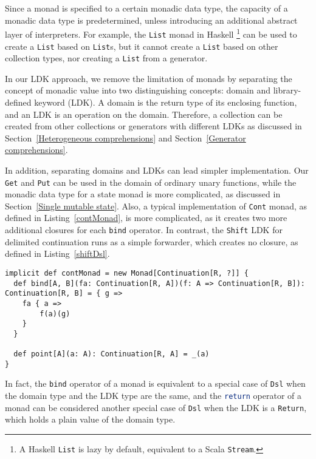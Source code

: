 Since a monad is specified to a certain monadic data type, the capacity of a monadic data type is predetermined, unless introducing an additional abstract layer of interpreters. For example, the \lstinline{List} monad in Haskell \footnote{A Haskell \lstinline{List} is lazy by default, equivalent to a Scala \lstinline{Stream}.} can be used to create a \lstinline{List} based on \lstinline{List}s, but it cannot create a \lstinline{List} based on other collection types, nor creating a \lstinline{List} from a generator.

In our LDK approach, we remove the limitation of monads by separating the concept of monadic value into two distinguishing concepts: domain and library-defined keyword (LDK). A domain is the return type of its enclosing function, and an LDK is an operation on the domain. Therefore, a collection can be created from other collections or generators with different LDKs as discussed in Section~\ref{Heterogeneous comprehensions} and Section~\ref{Generator comprehensions}. 

In addition, separating domains and LDKs can lead simpler implementation. Our \lstinline{Get} and \lstinline{Put} can be used in the domain of ordinary unary functions, while the monadic data type for a state monad is more complicated, as discussed in Section~\ref{Single mutable state}. Also, a typical implementation of \lstinline{Cont} monad, as defined in Listing~\ref{contMonad}, is more complicated, as it creates two more additional closures for each \lstinline{bind} operator. In contrast, the \lstinline{Shift} LDK for delimited continuation runs as a simple forwarder, which creates no closure, as defined in Listing~\ref{shiftDsl}.

\begin{lstlisting}[caption={A typical monad instance for continuation},label={contMonad}]
implicit def contMonad = new Monad[Continuation[R, ?]] {
  def bind[A, B](fa: Continuation[R, A])(f: A => Continuation[R, B]): Continuation[R, B] = { g =>
    fa { a =>
        f(a)(g)
    }
  }
    
  def point[A](a: A): Continuation[R, A] = _(a)
}
\end{lstlisting}

In fact, the \lstinline{bind} operator of a monad is equivalent to a special case of \lstinline{Dsl} when the domain type and the LDK type are the same, and the \lstinline[language=Haskell,deletekeywords={return}]{return} operator of a monad can be considered another special case of \lstinline{Dsl} when the LDK is a \lstinline{Return}, which holds a plain value of the domain type.

